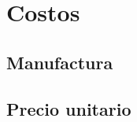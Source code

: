 
\newpage
\clearpage{\pagestyle{empty}\cleardoublepage}
\doublespacing
\chapter{Costos}
\newpage
\pagestyle{myportland}

\section{Manufactura}

\section{Precio unitario}


